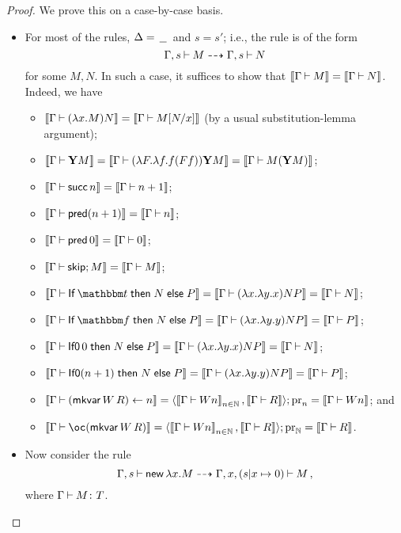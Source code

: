 \begin{proof}
  We prove this on a case-by-case basis.
  \begin{itemize}
    \item For most of the rules, $\Delta=\blank$ and $s=s'$; i.e., the rule is of the form
      \[
        \Gamma,s\ts M \oopto \Gamma,s \ts N
        \]
      for some $M,N$.
      In such a case, it suffices to show that $\deno{\Gamma\ts M}=\deno{\Gamma\ts N}$.
      Indeed, we have
      \begin{itemize}
        \item $\deno{\Gamma\ts(\lambda x.M)N} = \deno{\Gamma\ts M[N/x]}$ (by a usual substitution-lemma argument);
        \item $\deno{\Gamma\ts\Y M} = \deno{\Gamma\ts (\lambda F.\lambda f.f(F f)) \Y M} = \deno{\Gamma\ts M(\Y M)}$;
        \item $\deno{\Gamma\ts \suc n} = \deno{\Gamma \ts n+1}$;
        \item $\deno{\Gamma\ts \pred (n+1)} = \deno{\Gamma\ts n}$;
        \item $\deno{\Gamma\ts \pred 0} = \deno{\Gamma\ts 0}$;
        \item $\deno{\Gamma\ts\skipp;M} = \deno{\Gamma\ts M}$;
        \item $\deno{\Gamma\ts\If \true \Then N \Else P} = \deno{\Gamma\ts (\lambda x.\lambda y.x)NP} = \deno{\Gamma\ts N}$;
        \item $\deno{\Gamma\ts\If \false \Then N \Else P} = \deno{\Gamma\ts (\lambda x.\lambda y.y)NP} = \deno{\Gamma\ts P}$;
        \item $\deno{\Gamma\ts\IfO 0 \Then N \Else P} = \deno{\Gamma\ts (\lambda x.\lambda y.x)NP} = \deno{\Gamma\ts N}$;
        \item $\deno{\Gamma\ts\IfO (n+1) \Then N \Else P} = \deno{\Gamma\ts (\lambda x.\lambda y.y)NP} = \deno{\Gamma\ts P}$;
        \item \parbox[t][][t]{0.8\textwidth}{$\deno{\Gamma\ts(\mkvar W\,R)\gets n} = \langle \deno{\Gamma\ts Wn}_{n\in\bN},\deno{\Gamma\ts R}\rangle;\pr_n = \deno{\Gamma\ts Wn}$; and}
        \item $\deno{\Gamma\ts\oc(\mkvar W\,R)} = \langle \deno{\Gamma\ts Wn}_{n\in\bN},\deno{\Gamma\ts R}\rangle;\pr_{\bN} = \deno{\Gamma\ts R}$.
      \end{itemize}
    \item Now consider the rule
      \[
        \Gamma,s\ts\neww \lambda x.M\oopto \Gamma,x,(s\vert x\mapsto 0)\ts M\,,
        \]
      where $\Gamma\ts M\from T$.

\end{itemize}
\end{proof}
